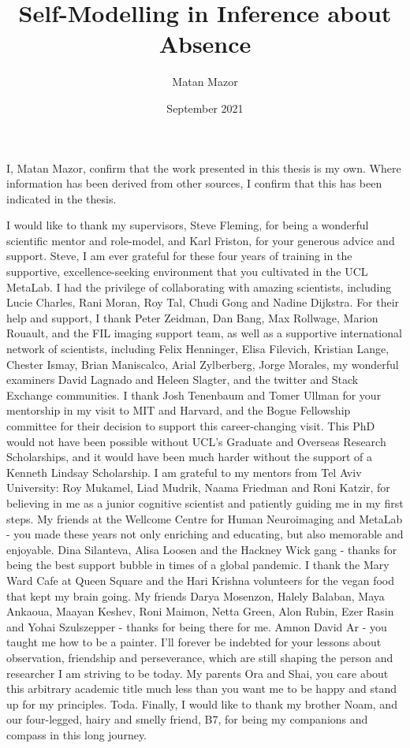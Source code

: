 \documentclass[12pt,twoside]{reedthesis}
\title{Self-Modelling in Inference about Absence}
\author{Matan Mazor}
\date{September 2021}
\begin{document}
  \maketitle

\frontmatter %
\pagestyle{empty} %
  \begin{declaration}
    I, Matan Mazor, confirm that the work presented in this thesis is my own. Where information has been derived from other sources, I confirm that this has been indicated in the thesis.
  \end{declaration}
  \begin{acknowledgements}
    I would like to thank my supervisors, Steve Fleming, for being a wonderful scientific mentor and role-model, and Karl Friston, for your generous advice and support. Steve, I am ever grateful for these four years of training in the supportive, excellence-seeking environment that you cultivated in the UCL MetaLab. I had the privilege of collaborating with amazing scientists, including Lucie Charles, Rani Moran, Roy Tal, Chudi Gong and Nadine Dijkstra. For their help and support, I thank Peter Zeidman, Dan Bang, Max Rollwage, Marion Rouault, and the FIL imaging support team, as well as a supportive international network of scientists, including Felix Henninger, Elisa Filevich, Kristian Lange, Chester Ismay, Brian Maniscalco, Arial Zylberberg, Jorge Morales, my wonderful examiners David Lagnado and Heleen Slagter, and the twitter and Stack Exchange communities. I thank Josh Tenenbaum and Tomer Ullman for your mentorship in my visit to MIT and Harvard, and the Bogue Fellowship committee for their decision to support this career-changing visit. This PhD would not have been possible without UCL's Graduate and Overseas Research Scholarships, and it would have been much harder without the support of a Kenneth Lindsay Scholarship. I am grateful to my mentors from Tel Aviv University: Roy Mukamel, Liad Mudrik, Naama Friedman and Roni Katzir, for believing in me as a junior cognitive scientist and patiently guiding me in my first steps. My friends at the Wellcome Centre for Human Neuroimaging and MetaLab - you made these years not only enriching and educating, but also memorable and enjoyable. Dina Silanteva, Alisa Loosen and the Hackney Wick gang - thanks for being the best support bubble in times of a global pandemic. I thank the Mary Ward Cafe at Queen Square and the Hari Krishna volunteers for the vegan food that kept my brain going. My friends Darya Mosenzon, Halely Balaban, Maya Ankaoua, Maayan Keshev, Roni Maimon, Netta Green, Alon Rubin, Ezer Rasin and Yohai Szulszepper - thanks for being there for me. Amnon David Ar - you taught me how to be a painter. I'll forever be indebted for your lessons about observation, friendship and perseverance, which are still shaping the person and researcher I am striving to be today. My parents Ora and Shai, you care about this arbitrary academic title much less than you want me to be happy and stand up for my principles. Toda. Finally, I would like to thank my brother Noam, and our four-legged, hairy and smelly friend, B7, for being my companions and compass in this long journey.

\end{acknowledgements}
\end{document}
